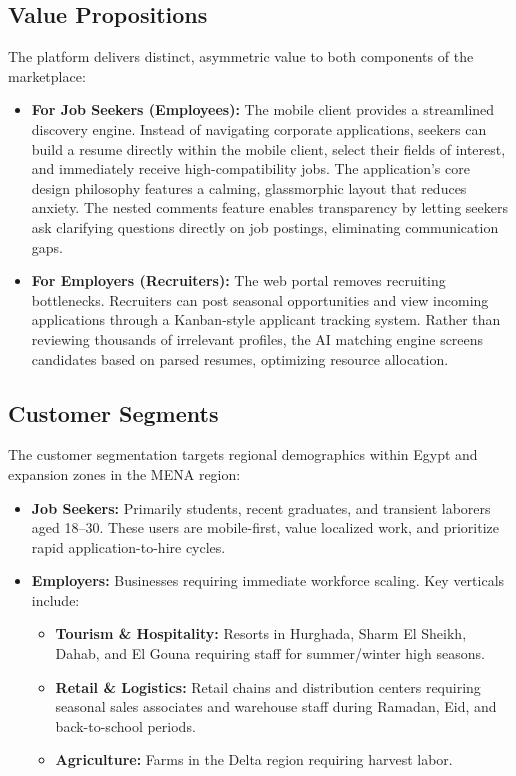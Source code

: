 \documentclass[12pt, a4paper]{report}
\begin{document}
\subsection{Value Propositions}
The platform delivers distinct, asymmetric value to both components of the marketplace:
\begin{itemize}
    \item \textbf{For Job Seekers (Employees):} The mobile client provides a streamlined discovery engine. Instead of navigating corporate applications, seekers can build a resume directly within the mobile client, select their fields of interest, and immediately receive high-compatibility jobs. The application's core design philosophy features a calming, glassmorphic layout that reduces anxiety. The nested comments feature enables transparency by letting seekers ask clarifying questions directly on job postings, eliminating communication gaps.
    \item \textbf{For Employers (Recruiters):} The web portal removes recruiting bottlenecks. Recruiters can post seasonal opportunities and view incoming applications through a Kanban-style applicant tracking system. Rather than reviewing thousands of irrelevant profiles, the AI matching engine screens candidates based on parsed resumes, optimizing resource allocation.
\end{itemize}

\subsection{Customer Segments}
The customer segmentation targets regional demographics within Egypt and expansion zones in the MENA region:
\begin{itemize}
    \item \textbf{Job Seekers:} Primarily students, recent graduates, and transient laborers aged 18--30. These users are mobile-first, value localized work, and prioritize rapid application-to-hire cycles.
    \item \textbf{Employers:} Businesses requiring immediate workforce scaling. Key verticals include:
    \begin{itemize}
        \item \textbf{Tourism \& Hospitality:} Resorts in Hurghada, Sharm El Sheikh, Dahab, and El Gouna requiring staff for summer/winter high seasons.
        \item \textbf{Retail \& Logistics:} Retail chains and distribution centers requiring seasonal sales associates and warehouse staff during Ramadan, Eid, and back-to-school periods.
        \item \textbf{Agriculture:} Farms in the Delta region requiring harvest labor.
    \end{itemize}
\end{itemize}
\end{document}
